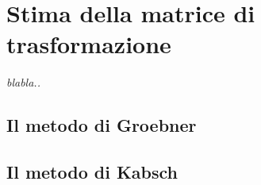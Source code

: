 \chapter{Stima della matrice di trasformazione}
\label{chap:stima}

\begin{minipage}{12cm}\textit{blabla..}
\end{minipage}

\vspace*{1cm}



\section{Il metodo di Groebner}
\label{sec:groeb}



\section{Il metodo di Kabsch}
\label{sec:kabsh}